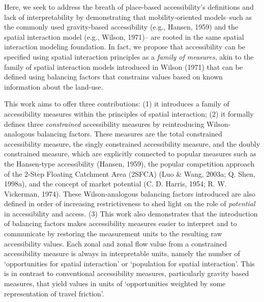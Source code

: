 \documentclass[
11pt, %
oneside, %
english, %
singlespacing, %
]{macthesis} %
\begin{document}
Here, we seek to address the breath of place-based accessibility's definitions and lack of interpretability by demonstrating that mobility-oriented models--such as the commonly used gravity-based accessibility (e.g., Hansen, 1959) and the spatial interaction model (e.g., Wilson, 1971)-- are rooted in the same spatial interaction modeling foundation. In fact, we propose that accessibility can be specified using spatial interaction principles as a \emph{family of measures}, akin to the family of spatial interaction models introduced in Wilson (1971) that can be defined using balancing factors that constrains values based on known information about the land-use.

This work aims to offer three contributions: (1) it introduces a family of accessibility measures within the principles of spatial interaction; (2) it formally defines three \emph{constrained} accessibility measures by reintroducing Wilson-analogous balancing factors. These measures are the total constrained accessibility measure, the singly constrained accessibility measure, and the doubly constrained measure, which are explicitly connected to popular measures such as the Hansen-type accessibility (Hansen, 1959), the popular competition approach of the 2-Step Floating Catchment Area (2SFCA) (Luo \& Wang, 2003a; Q. Shen, 1998a), and the concept of market potential (C. D. Harris, 1954; R. W. Vickerman, 1974). These Wilson-analogous balancing factors introduced are also defined in order of increasing restrictiveness to shed light on the role of \emph{potential} in accessibility and access. (3) This work also demonstrates that the introduction of balancing factors makes accessibility measures easier to interpret and to communicate by restoring the measurement units to the resulting raw accessibility values. Each zonal and zonal flow value from a constrained accessibility measure is always in interpretable units, namely the number of `opportunities for spatial interaction' or `population for spatial interaction'. This is in contrast to conventional accessibility measures, particularly gravity based measures, that yield values in units of `opportunities weighted by some representation of travel friction'.
\end{document}
